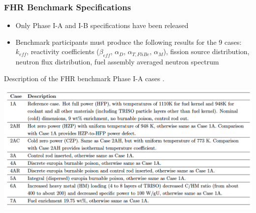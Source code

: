 \begin{frame}
    \frametitle{FHR Benchmark Specifications}
    \begin{itemize}
        \item Only Phase I-A and I-B specifications have been released 
        \item Benchmark participants must produce the following results for 
        the 9 cases: $k_{eff}$, reactivity coefficients ($\beta_{eff}$, 
        $\alpha_D$, $\alpha_{T, FliBe}$, $\alpha_M$), fission source distribution, 
        neutron flux distribution, fuel assembly averaged neutron spectrum
    \end{itemize}
    \vspace{-0.25cm}
    \begin{table}
        \caption{Description of the \acrlong{FHR} benchmark Phase I-A cases 
        \vspace{-0.25cm}
        \cite{noauthor_fluoride_nodate}.}
        \includegraphics[width=0.8\linewidth]{figures/benchmark-cases.png} 
    \end{table}
\end{frame}